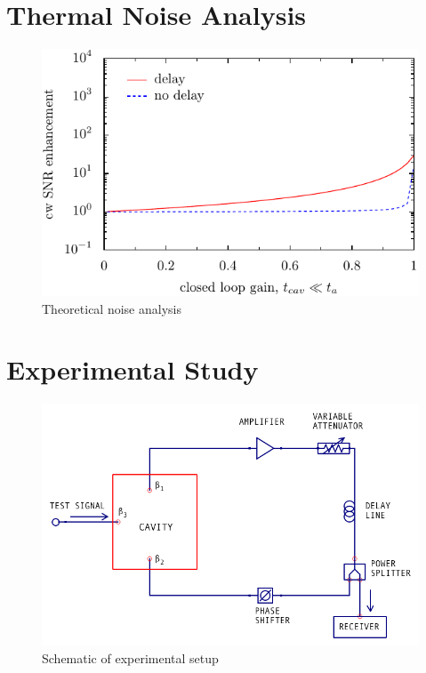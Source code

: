 \documentclass[aps,prl,twocolumn,groupedaddress]{revtex4-1}
\begin{document}
                                
%
%
%
%
%
%
%
%
%
%

\section{Thermal Noise Analysis}

\begin{figure}[htbp]
\includegraphics[width=.5\textwidth]{figs/looking_at_coth}
\caption{Theoretical noise analysis}
\label{fig:analysis}
\end{figure}
\section{Experimental Study}

\begin{figure}[htbp]
\includegraphics[width=.5\textwidth]{figs/no_isolator}
\caption{Schematic of experimental setup}
\label{fig:schematic_of_prototype}
\end{figure}
\end{document}
